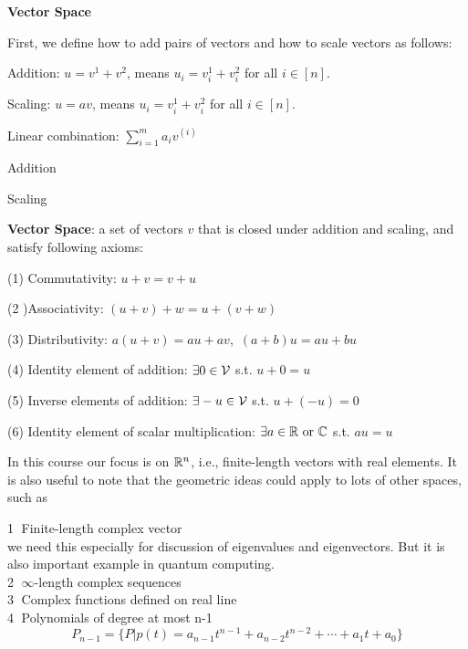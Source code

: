 \vspace{0.5cm}
\noindent\textbf{Vector Space}

First, we define how to add pairs of vectors and how to scale vectors as follows:

Addition: $u=v^{1}+v^{2}$, means $u_{i}=v_{i}^{1}+v_{i}^{2}$ for all $i\in [n]$.

Scaling: $u=av$,  means $u_{i}=v_{i}^{1}+v_{i}^{2}$ for all $i\in [n]$.

Linear combination: $\sum_{i=1}^{m} a_{i}v^{(i)}$

\begin{marginfigure}
	\centering
	\resizebox{7.5cm}{3cm}{}
	\caption{Addition}
	\label{fig.2-1}
\end{marginfigure}
\begin{marginfigure}
	\centering
	\resizebox{7.5cm}{3cm}{}
	\caption{Scaling}
	\label{fig.2-2}
\end{marginfigure}

\vspace{0.5cm}

\textbf{Vector Space}: a set of vectors $v$ that is closed under addition and scaling, and satisfy following axioms:

(1) Commutativity: $u+v=v+u$

(2 )Associativity: $(u+v)+w=u+(v+w)$

(3) Distributivity: $a(u+v)=au+av$,\ $(a+b)u=au+bu$

(4) Identity element of addition: $\exists 0\in \cal{V}$ s.t. $u+0=u$

(5) Inverse elements of addition: $\exists -u\in \cal{V}$ s.t. $u+(-u)=0$

(6) Identity element of scalar multiplication: $\exists a\in \mathbb{R}\ \text{or}\ \mathbb{C}$ s.t. $au=u$

\vspace{0.5cm}
In this course our focus is on $\mathbb{R}^{n}$, i.e., finite-length vectors with real elements. It is also useful to note that the geometric ideas could apply to lots of other spaces, such as

\textcircled{1} Finite-length complex vector\\
we need this especially for discussion of eigenvalues and eigenvectors. But it is also important example in quantum computing.\\
\textcircled{2} $\infty$-length complex sequences\\
\textcircled{3} Complex functions defined on real line\\
\textcircled{4} Polynomials of degree at most n-1\\
$$P_{n-1}=\{P|p(t)=a_{n-1}t^{n-1}+a_{n-2}t^{n-2}+\cdots + a_{1}t+a_{0} \}$$

